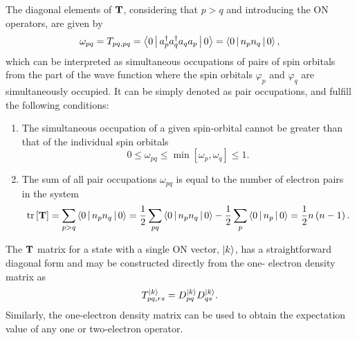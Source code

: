 The diagonal elements of $ \mat{T}$, considering that $p > q$ and introducing
the ON operators, are given by
\begin{equation}
    \omega_{pq} = T_{pq,pq} =
    \Braket{0 | a_p^{\dagger} a_q^{\dagger} a_q a_p | 0} =
    \Braket{0 | n_p n_q | 0},
\end{equation}
which can be interpreted as simultaneous occupations of pairs of spin orbitals
from the part of the wave function where the spin
orbitals $\varphi_p$ and $\varphi_q$ are simultaneously occupied.
It can be simply denoted as pair occupations, and fulfill the following conditions:
\begin{enumerate}
    \item The simultaneous occupation of a given spin-orbital cannot be greater than that
        of the individual spin orbitals
        \begin{equation}
            0 \le \omega_{pq} \le \min\left[ \omega_p, \omega_q \right] \le 1
            .
        \end{equation}

    \item The sum of all pair occupations $\omega_{pq}$ is equal to the number of
        electron pairs in the system 
        \begin{equation}
            \trace \left[ \mat{T} \right] =
            \sum_{p>q} \Braket{0 | n_p n_q | 0} =
            \frac{1}{2} \sum_{pq} \Braket{0 | n_p n_q | 0}
            - \frac{1}{2} \sum_{p} \Braket{0 | n_p | 0} =
            \frac{1}{2} n \left( n - 1 \right)
            .
        \end{equation}
\end{enumerate}

The $ \mat{T}$ matrix for a state with a single ON vector, $\Ket{k}$, has a 
straightforward diagonal form and may be constructed directly from the one-
electron density matrix as
\begin{equation} \label{eq:T_from_D1s}
    T_{pq,rs}^{\Ket{k}} = D_{pq}^{\Ket{k}} D_{qs}^{\Ket{k}}
    .
\end{equation}
Similarly, the one-electron density matrix can be used to obtain the 
expectation value of any one or two-electron operator.

